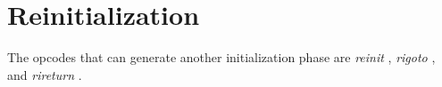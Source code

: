\begin{comment}
\documentclass[10pt]{article}
\usepackage{fullpage, graphicx, url}
\setlength{\parskip}{1ex}
\setlength{\parindent}{0ex}
\title{Reinitialization}



\begin{tabular}{ccc}
The Alternative Csound Reference Manual & & \\
Previous &Instrument Control &Next

\end{tabular}

\end{comment}
\section{Reinitialization}


  The opcodes that can generate another initialization phase are \emph{reinit}
, \emph{rigoto}
, and \emph{rireturn}
. 


\begin{comment}
\begin{tabular}{lcr}
Previous &Home &Next \\
Real-time Performance Control &Up &Sensing and Control

\end{tabular}



\end{comment}
